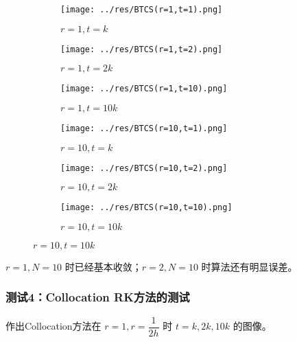 \documentclass[lang=cn,a4paper,newtx,bibend=bibtex]{elegantpaper}
\begin{document}
\begin{figure}[H]
    \centering
    \begin{subfigure}[b]{0.30\textwidth}
        \texttt{[image: ../res/BTCS(r=1,t=1).png]}
        \caption{$r=1, t=k$}
    \end{subfigure}
    \hfill
    \begin{subfigure}[b]{0.30\textwidth}
        \texttt{[image: ../res/BTCS(r=1,t=2).png]}
        \caption{$r=1, t=2k$}
    \end{subfigure}
    \hfill
    \begin{subfigure}[b]{0.30\textwidth}
        \texttt{[image: ../res/BTCS(r=1,t=10).png]}
        \caption{$r=1, t=10k$}
    \end{subfigure}
    \begin{subfigure}[b]{0.30\textwidth}
        \texttt{[image: ../res/BTCS(r=10,t=1).png]}
        \caption{$r=10, t=k$}
    \end{subfigure}
    \hfill
    \begin{subfigure}[b]{0.30\textwidth}
        \texttt{[image: ../res/BTCS(r=10,t=2).png]}
        \caption{$r=10, t=2k$}
    \end{subfigure}
    \hfill
    \begin{subfigure}[b]{0.30\textwidth}
        \texttt{[image: ../res/BTCS(r=10,t=10).png]}
        \caption{$r=10, t=10k$}
    \end{subfigure}
  \end{figure}

$r=1,N=10$ 时已经基本收敛；$r=2,N=10$ 时算法还有明显误差。

\subsubsection{测试4：Collocation RK方法的测试}

作出Collocation方法在 $r=1, r=\dfrac 1{2h}$ 时 $t=k,2k,10k$ 的图像。
\end{document}
